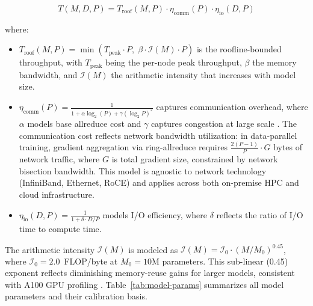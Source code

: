 \documentclass{llncs}
\begin{document}
\begin{equation}
T(M, D, P) = T_{\text{roof}}(M, P) \cdot \eta_{\text{comm}}(P) \cdot \eta_{\text{io}}(D, P)
\label{eq:throughput}
\end{equation}

where:

\begin{itemize}
    \item $T_{\text{roof}}(M, P) = \min\left(T_{\text{peak}} \cdot P,\; \beta \cdot \mathcal{I}(M) \cdot P\right)$ is the roofline-bounded throughput, with $T_{\text{peak}}$ being the per-node peak throughput, $\beta$ the memory bandwidth, and $\mathcal{I}(M)$ the arithmetic intensity that increases with model size.
    \item $\eta_{\text{comm}}(P) = \frac{1}{1 + \alpha \log_2(P) + \gamma (\log_2 P)^2}$ captures communication overhead, where $\alpha$ models base allreduce cost and $\gamma$ captures congestion at large scale \cite{Thakur2005Allreduce}. The communication cost reflects network bandwidth utilization: in data-parallel training, gradient aggregation via ring-allreduce requires $\frac{2(P-1)}{P} \cdot G$ bytes of network traffic, where $G$ is total gradient size, constrained by network bisection bandwidth. This model is agnostic to network technology (InfiniBand, Ethernet, RoCE) and applies across both on-premise HPC and cloud infrastructure.
    \item $\eta_{\text{io}}(D, P) = \frac{1}{1 + \delta \cdot D/P}$ models I/O efficiency, where $\delta$ reflects the ratio of I/O time to compute time.
\end{itemize}

The arithmetic intensity $\mathcal{I}(M)$ is modeled as $\mathcal{I}(M) = \mathcal{I}_0 \cdot (M/M_0)^{0.45}$, where $\mathcal{I}_0 = 2.0$~FLOP/byte at $M_0 = 10$M parameters. This sub-linear (0.45) exponent reflects diminishing memory-reuse gains for larger models, consistent with A100 GPU profiling \cite{Jia2018}. Table~\ref{tab:model-params} summarizes all model parameters and their calibration basis.
\end{document}
